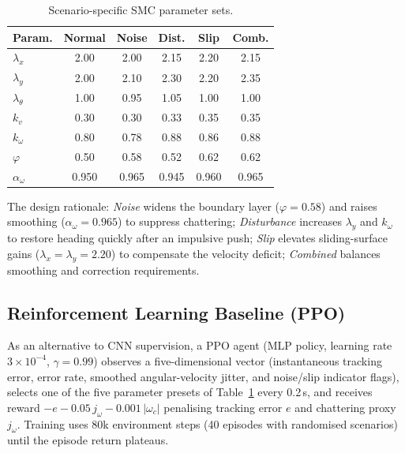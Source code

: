\documentclass[11pt,a4paper]{article}
\begin{document}
\begin{table}[ht]
    \centering
    \caption{Scenario-specific SMC parameter sets.}
    \label{tab:presets}
    \begin{tabular}{lccccc}
        \toprule
        \textbf{Param.} & \textbf{Normal} & \textbf{Noise} & \textbf{Dist.} & \textbf{Slip} & \textbf{Comb.} \\
        \midrule
        $\lambda_x$      & 2.00  & 2.00  & 2.15  & 2.20  & 2.15  \\
        $\lambda_y$      & 2.00  & 2.10  & 2.30  & 2.20  & 2.35  \\
        $\lambda_\theta$ & 1.00  & 0.95  & 1.05  & 1.00  & 1.00  \\
        $k_v$            & 0.30  & 0.30  & 0.33  & 0.35  & 0.35  \\
        $k_\omega$       & 0.80  & 0.78  & 0.88  & 0.86  & 0.88  \\
        $\varphi$        & 0.50  & 0.58  & 0.52  & 0.62  & 0.62  \\
        $\alpha_\omega$  & 0.950 & 0.965 & 0.945 & 0.960 & 0.965 \\
        \bottomrule
    \end{tabular}
\end{table}

The design rationale: \emph{Noise} widens the boundary layer ($\varphi = 0.58$) and raises
smoothing ($\alpha_\omega = 0.965$) to suppress chattering; \emph{Disturbance} increases
$\lambda_y$ and $k_\omega$ to restore heading quickly after an impulsive push; \emph{Slip}
elevates sliding-surface gains ($\lambda_x = \lambda_y = 2.20$) to compensate the velocity
deficit; \emph{Combined} balances smoothing and correction requirements.

\subsection{Reinforcement Learning Baseline (PPO)}

As an alternative to CNN supervision, a PPO agent (MLP policy, learning rate
$3 \times 10^{-4}$, $\gamma = 0.99$) observes a five-dimensional vector (instantaneous
tracking error, error rate, smoothed angular-velocity jitter, and noise/slip indicator
flags), selects one of the five parameter presets of Table~\ref{tab:presets} every 0.2\,s,
and receives reward $-e - 0.05\, j_\omega - 0.001\, |\omega_c|$ penalising tracking error
$e$ and chattering proxy $j_\omega$. Training uses 80k environment steps (40 episodes with
randomised scenarios) until the episode return plateaus.
\end{document}
